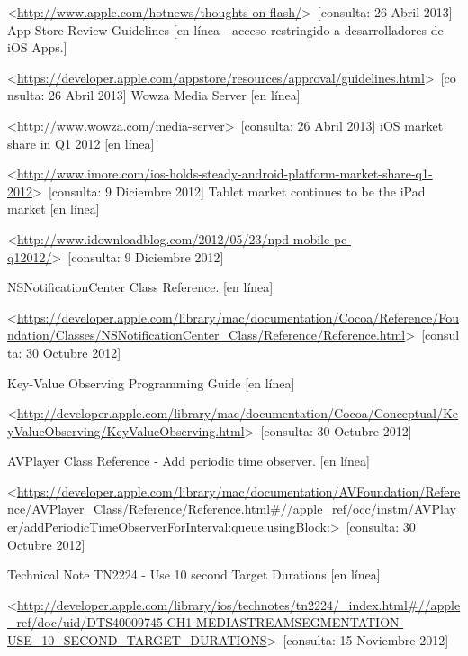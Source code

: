 \begin{thebibliography}{99}
\begin{sloppypar}
\textless \url{http://www.apple.com/hotnews/thoughts-on-flash/}\textgreater \ [consulta: 26 Abril 2013]
%
App Store Review Guidelines [en línea - acceso restringido a desarrolladores de iOS Apps.]\

\textless \url{https://developer.apple.com/appstore/resources/approval/guidelines.html}\textgreater \ [consulta: 26 Abril 2013]
%
Wowza Media Server [en línea]\

\textless \url{http://www.wowza.com/media-server}\textgreater \ [consulta: 26 Abril 2013]
%
iOS market share in Q1 2012 [en línea] \

\textless \url{http://www.imore.com/ios-holds-steady-android-platform-market-share-q1-2012}\textgreater \ [consulta: 9 Diciembre 2012]
%
Tablet market continues to be the iPad market [en línea] \

\textless \url{http://www.idownloadblog.com/2012/05/23/npd-mobile-pc-q12012/}\textgreater \ [consulta: 9 Diciembre 2012]

%
NSNotificationCenter Class Reference. [en línea]\

\textless \url{https://developer.apple.com/library/mac/documentation/Cocoa/Reference/Foundation/Classes/NSNotificationCenter_Class/Reference/Reference.html}\textgreater \ [consulta: 30 Octubre 2012]

Key-Value Observing Programming Guide [en línea]\

\textless \url{http://developer.apple.com/library/mac/documentation/Cocoa/Conceptual/KeyValueObserving/KeyValueObserving.html}\textgreater \ [consulta: 30 Octubre 2012]

%
AVPlayer Class Reference - Add periodic time observer. [en línea]\

\textless \url{https://developer.apple.com/library/mac/documentation/AVFoundation/Reference/AVPlayer_Class/Reference/Reference.html\#//apple_ref/occ/instm/AVPlayer/addPeriodicTimeObserverForInterval:queue:usingBlock:}\textgreater \ [consulta: 30 Octubre 2012]


Technical Note TN2224 - Use 10 second Target Durations [en línea]\

\textless \url{http://developer.apple.com/library/ios/technotes/tn2224/_index.html\#//apple_ref/doc/uid/DTS40009745-CH1-MEDIASTREAMSEGMENTATION-USE_10_SECOND_TARGET_DURATIONS}\textgreater \ [consulta: 15 Noviembre 2012]


\end{sloppypar}
\end{thebibliography}
